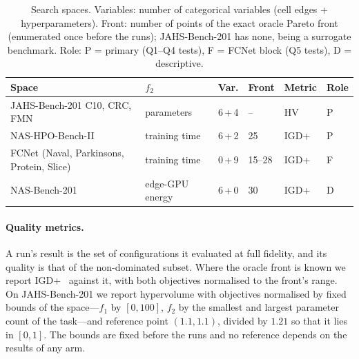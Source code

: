 \begin{table}[t]
    \centering
    \footnotesize
    \setlength{\tabcolsep}{3pt}
    \caption{Search spaces. Variables: number of categorical variables (cell edges + hyperparameters). Front: number
    of points of the exact oracle Pareto front (enumerated once before the runs); JAHS-Bench-201 has none, being a
    surrogate benchmark. Role: P = primary (Q1--Q4 tests), F = FCNet block (Q5 tests), D = descriptive.}
    \label{tab:v005-spaces}
    \begin{tabular}{@{}llrlll@{}}
        \toprule
        \textbf{Space} & \textbf{$f_2$} & \textbf{Var.} & \textbf{Front} & \textbf{Metric} & \textbf{Role} \\
        \midrule
        JAHS-Bench-201 C10, CRC, FMN & parameters & 6\,+\,4 & -- & HV & P \\
        NAS-HPO-Bench-II & training time & 6\,+\,2 & 25 & IGD+ & P \\
        FCNet (Naval, Parkinsons, Protein, Slice) & training time & 0\,+\,9 & 15--28 & IGD+ & F \\
        NAS-Bench-201 & edge-GPU energy & 6\,+\,0 & 30 & IGD+ & D \\
        \bottomrule
    \end{tabular}
\end{table}

\paragraph{Quality metrics.} A run's result is the set of configurations it evaluated at full fidelity, and its
quality is that of the non-dominated subset. Where the oracle front is known we report IGD+~\citep{ishibuchi2015igdplus}
against it, with both objectives normalised to the front's range. On JAHS-Bench-201 we report hypervolume with
objectives normalised by fixed bounds of the space---$f_1$ by $[0, 100]$, $f_2$ by the smallest and largest parameter
count of the task---and reference point $(1.1, 1.1)$, divided by $1.21$ so that it lies in $[0, 1]$. The bounds are
fixed before the runs and no reference depends on the results of any arm.

